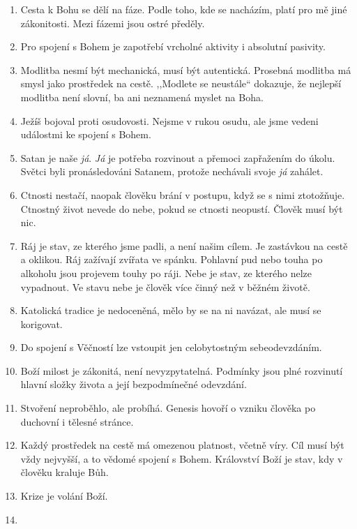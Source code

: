 \begin{enumerate}
  \item{
      Cesta k Bohu se dělí na fáze. Podle toho, kde se nacházím, platí pro mě
      jiné zákonitosti.  Mezi fázemi jsou ostré předěly.
  }
  \item{
      Pro spojení s Bohem je zapotřebí vrcholné aktivity i absolutní pasivity.
  }
  \item{
      Modlitba nesmí být mechanická, musí být autentická.
      Prosebná modlitba má smysl jako prostředek na cestě.
      ,,Modlete se neustále`` dokazuje, že nejlepší modlitba není slovní, ba ani neznamená myslet na Boha.
  }
  \item{
    Ježíš bojoval proti osudovosti.
    Nejsme v rukou osudu, ale jsme vedeni událostmi ke spojení s Bohem.
  }
  \item{
    Satan je naše \textit{já}.
    \textit{Já} je potřeba rozvinout a přemoci zapřažením do úkolu.
    Světci byli pronásledováni Satanem, protože nechávali svoje \textit{já} zahálet.
  }
  \item{
    Ctnosti nestačí, naopak člověku brání v postupu, když se s nimi ztotožňuje.
    Ctnostný život nevede do nebe, pokud se ctnosti neopustí.
    Člověk musí být nic.
  }
  \item{
    Ráj je stav, ze kterého jsme padli, a není našim cílem.
    Je zastávkou na cestě a oklikou.
    Ráj zažívají zvířata ve spánku.
    Pohlavní pud nebo touha po alkoholu jsou projevem touhy po ráji.
    Nebe je stav, ze kterého nelze vypadnout.
    Ve stavu nebe je člověk více činný než v běžném životě.
  }
  \item{
    Katolická tradice je nedoceněná, mělo by se na ni navázat, ale musí se korigovat.
  }
  \item{
    Do spojení s Věčností lze vstoupit jen celobytostným sebeodevzdáním.
  }
  \item{
    Boží milost je zákonitá, není nevyzpytatelná.
    Podmínky jsou plné rozvinutí hlavní složky života a její bezpodmínečné odevzdání.
  }
  \item{
    Stvoření neproběhlo, ale probíhá.
    Genesis hovoří o vzniku člověka po duchovní i tělesné stránce.
  }
  \item{
    Každý prostředek na cestě má omezenou platnost, včetně víry.
    Cíl musí být vždy nejvyšší, a to vědomé spojení s Bohem.
    Království Boží je stav, kdy v člověku kraluje Bůh.
  }
  \item{
    Krize je volání Boží.
  }
  \item{
}
\end{enumerate}
